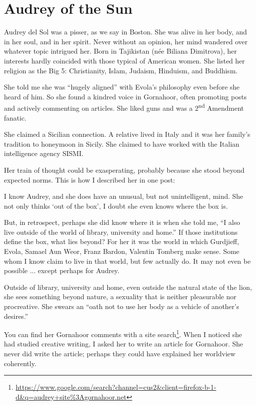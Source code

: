 \section{Audrey of the Sun}

Audrey del Sol was a pisser, as we say in Boston. She was alive in her body, and in her soul, and in her spirit. Never without an opinion, her mind wandered over whatever topic intrigued her. Born in Tajikistan (née Biliana Dimitrova), her interests hardly coincided with those typical of American women. She listed her religion as the Big 5: Christianity, Islam, Judaism, Hinduism, and Buddhism.

She told me she was ``hugely aligned'' with Evola's philosophy even before she heard of him. So she found a kindred voice in Gornahoor, often promoting posts and actively commenting on articles. She liked guns and was a 2\textsuperscript{nd} Amendment fanatic.

She claimed a Sicilian connection. A relative lived in Italy and it was her family's tradition to honeymoon in Sicily. She claimed to have worked with the Italian intelligence agency SISMI.

Her train of thought could be exasperating, probably because she stood beyond expected norms. This is how I described her in one post:


\begin{quotex}
I know Audrey, and she does have an unusual, but not unintelligent, mind. She not only thinks `out of the box', I doubt she even knows where the box is.
\end{quotex}


But, in retrospect, perhaps she did know where it is when she told me, ``I also live outside of the world of library, university and home.'' If those institutions define the box, what lies beyond? For her it was the world in which Gurdjieff, Evola, Samael Aun Weor, Franz Bardon, Valentin Tomberg make sense. Some whom I know claim to live in that world, but few actually do. It may not even be possible ... except perhaps for Audrey.

Outside of library, university and home, even outside the natural state of the lion, she sees something beyond nature, a sexuality that is neither pleasurable nor procreative. She swears an ``oath not to use her body as a vehicle of another's desires.''

You can find her Gornahoor comments with a site search\footnote{\url{https://www.google.com/search?channel=cus2&client=firefox-b-1-d&q=audrey+site\%3Agornahoor.net}}. When I noticed she had studied creative writing, I asked her to write an article for Gornahoor. She never did write the article; perhaps they could have explained her worldview coherently.

